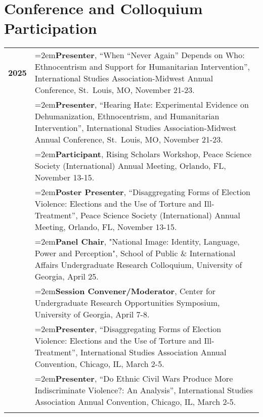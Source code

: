 \documentclass[letterpaper,12pt]{article}
\begin{document}
\section{Conference and Colloquium Participation}
\begin{xltabular}{\dimexpr\textwidth-0in}{p{.85in}X}
\textbf{2025} & \hangindent=2em\textbf{Presenter}, ``When “Never Again” Depends on Who: Ethnocentrism and Support for \mbox{Humanitarian} Intervention”, International Studies Association-Midwest Annual \mbox{Conference}, \mbox{St. Louis}, MO, November 21-23.\\
                     & \hangindent=2em\textbf{Presenter}, ``Hearing Hate: Experimental Evidence on Dehumanization, Ethnocentrism, and Humanitarian Intervention”, International Studies Association-Midwest Annual Conference, \mbox{St. Louis}, MO, November 21-23.\\
                     & \hangindent=2em\textbf{Participant}, Rising Scholars Workshop, Peace Science Society (International) Annual Meeting, Orlando, FL, November 13-15.\\
                     & \hangindent=2em\textbf{Poster Presenter}, ``Disaggregating Forms of Election Violence: Elections and the Use of Torture and Ill-Treatment”, Peace Science Society (International) Annual Meeting, Orlando, FL, November 13-15.\\
                     & \hangindent=2em\textbf{Panel Chair}, "National Image: Identity, Language, Power and Perception", School of \mbox{Public} \& International Affairs Undergraduate Research Colloquium, University of \mbox{Georgia}, April 25.\\
                     & \hangindent=2em\textbf{Session Convener/Moderator}, Center for Undergraduate Research Opportunities \mbox{Symposium}, University of Georgia, April 7-8.\\
                     & \hangindent=2em\textbf{Presenter}, ``Disaggregating Forms of Election Violence: Elections and the Use of Torture and Ill-Treatment”, International Studies Association Annual Convention, Chicago, IL, March 2-5.\\
                     & \hangindent=2em\textbf{Presenter}, ``Do Ethnic Civil Wars Produce More Indiscriminate Violence?: An Analysis”, International Studies Association Annual Convention, Chicago, IL, March 2-5.\\ \\

\end{xltabular}
\end{document}
